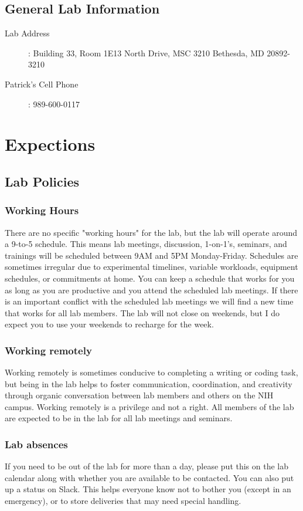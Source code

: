 \documentclass[10pt, a4paper, twocolumn]{article} %
\begin{document}
\subsection{General Lab Information}
\begin{description}
\item [Lab Address]: \newline Building 33, Room 1E13  North Drive, MSC 3210 \newline Bethesda, MD 20892-3210
\item [Patrick's Cell Phone]: 989-600-0117
\end{description}

\section{Expections}
\subsection{Lab Policies}
\subsubsection{Working Hours}
There are no specific "working hours" for the lab, but the lab will operate around a 9-to-5 schedule. This means lab meetings, discussion, 1-on-1's, seminars, and trainings will be scheduled between 9AM and 5PM Monday-Friday. Schedules are sometimes irregular due to experimental timelines, variable workloads, equipment schedules, or commitments at home. You can keep a schedule that works for you as long as you are productive and you attend the scheduled lab meetings. If there is an important conflict with the scheduled lab meetings we will find a new time that works for all lab members. The lab will not close on weekends, but I do expect you to use your weekends to recharge for the week.
\subsubsection{Working remotely} Working remotely is sometimes conducive to completing a writing or coding task, but being in the lab helps to foster communication, coordination, and creativity through organic conversation between lab members and others on the NIH campus. Working remotely is a privilege and not a right. All members of the lab are expected to be in the lab for all lab meetings and seminars.
\subsubsection{Lab absences} If you need to be out of the lab for more than a day, please put this on the lab calendar along with whether you are available to be contacted. You can also put up a status on Slack. This helps everyone know not to bother you (except in an emergency), or to store deliveries that may need special handling.
\end{document}
